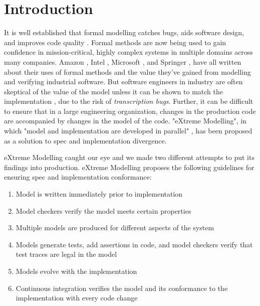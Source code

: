 \documentclass{vldb}
\begin{document}
\section{Introduction}
\label{sec:introduction}
It is well established that formal modelling catches bugs, aids software design, and improves code quality \cite{Newcombe2014UseOfFormalMethodsAmazon}. 
Formal methods are now being used to gain confidence in mission-critical, highly complex systems in multiple domains across many companies. 
Amazon \cite{Newcombe2014UseOfFormalMethodsAmazon, Chudnov18AmazonS2N, Cook18SecurityAWS}, Intel \cite{Kaivola09IntelI7, Beers08IntelExperience}, Microsoft \cite{Shukla18AzureCosmosDB}, and Springer \cite{Neubauer12AutomatedContinuousQualityAssurance}, have all written about their uses of formal methods and the value they've gained from modelling and verifying industrial software. 
But software engineers in industry are often skeptical of the value of the model unless it can be shown to match the implementation \cite{Wayne18AgileFormalMethods, Newcombe2014UseOfFormalMethodsAmazon}, due to the risk of \textit{transcription bugs}.
Further, it can be difficult to ensure that in a large engineering organization, changes in the production code are accompanied by changes in the model of the code.
"eXtreme Modelling", in which "model and implementation are developed in parallel" \cite{Gravell11ConcurrentDevelopmentOfModelAndImplementation}, has been proposed as a solution to spec and implementation divergence.

eXtreme Modelling caught our eye and we made two different attempts to put its findings into production.
eXtreme Modelling proposes the following guidelines for ensuring spec and implementation conformance:
\begin{enumerate}
  \item Model is written immediately prior to implementation
  \item Model checkers verify the model meets certain properties
  \item Multiple models are produced for different aspects of the system
  \item Models generate tests, add assertions in code, and model checkers verify that test traces are legal in the model
  \item Models evolve with the implementation
  \item Continuous integration verifies the model and its conformance to the implementation with every code change
\end{enumerate}
\end{document}
